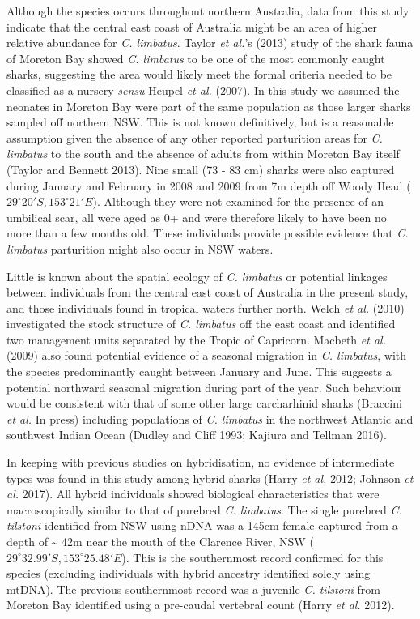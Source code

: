 \documentclass[]{article}
\begin{document}
Although the species occurs throughout northern Australia, data from
this study indicate that the central east coast of Australia might be an
area of higher relative abundance for \emph{C. limbatus}. Taylor
\emph{et al.}'s (2013) study of the shark fauna of Moreton Bay showed
\emph{C. limbatus} to be one of the most commonly caught sharks,
suggesting the area would likely meet the formal criteria needed to be
classified as a nursery \emph{sensu} Heupel \emph{et al.} (2007). In
this study we assumed the neonates in Moreton Bay were part of the same
population as those larger sharks sampled off northern NSW. This is not
known definitively, but is a reasonable assumption given the absence of
any other reported parturition areas for \emph{C. limbatus} to the south
and the absence of adults from within Moreton Bay itself (Taylor and
Bennett 2013). Nine small (73 - 83 cm) sharks were also captured during
January and February in 2008 and 2009 from 7m depth off Woody Head
(\(29^\circ 20'S, 153^\circ 21'E\)). Although they were not examined for
the presence of an umbilical scar, all were aged as 0+ and were
therefore likely to have been no more than a few months old. These
individuals provide possible evidence that \emph{C. limbatus}
parturition might also occur in NSW waters.

Little is known about the spatial ecology of \emph{C. limbatus} or
potential linkages between individuals from the central east coast of
Australia in the present study, and those individuals found in tropical
waters further north. Welch \emph{et al.} (2010) investigated the stock
structure of \emph{C. limbatus} off the east coast and identified two
management units separated by the Tropic of Capricorn. Macbeth \emph{et
al.} (2009) also found potential evidence of a seasonal migration in
\emph{C. limbatus}, with the species predominantly caught between
January and June. This suggests a potential northward seasonal migration
during part of the year. Such behaviour would be consistent with that of
some other large carcharhinid sharks (Braccini \emph{et al.} In press)
including populations of \emph{C. limbatus} in the northwest Atlantic
and southwest Indian Ocean (Dudley and Cliff 1993; Kajiura and Tellman
2016).

In keeping with previous studies on hybridisation, no evidence of
intermediate types was found in this study among hybrid sharks (Harry
\emph{et al.} 2012; Johnson \emph{et al.} 2017). All hybrid individuals
showed biological characteristics that were macroscopically similar to
that of purebred \emph{C. limbatus}. The single purebred \emph{C.
tilstoni} identified from NSW using nDNA was a 145cm female captured
from a depth of \textasciitilde{} 42m near the mouth of the Clarence
River, NSW (\(29^\circ 32.99'S, 153^\circ 25.48'E\)). This is the
southernmost record confirmed for this species (excluding individuals
with hybrid ancestry identified solely using mtDNA). The previous
southernmost record was a juvenile \emph{C. tilstoni} from Moreton Bay
identified using a pre-caudal vertebral count (Harry \emph{et al.}
2012).
\end{document}
